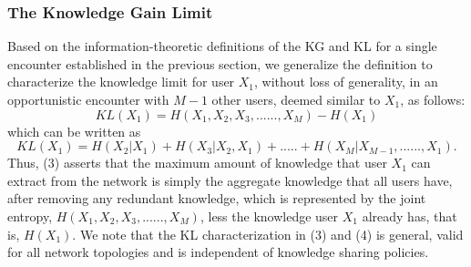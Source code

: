 \documentclass[12pt,epsf]{article}
\theoremstyle{definition}
\begin{document}
\subsubsection{The Knowledge Gain Limit}
\vspace{-0.2 cm}
Based on the information-theoretic definitions of the KG and KL for a single encounter established in the previous section, we generalize the definition to characterize the knowledge limit for user $X_1$, without loss of generality, in an opportunistic encounter with $M-1$ other users, deemed similar to $X_1$, as follows: 
\vspace{-0.6 cm}
\begin{equation}
		KL(X_1) = H(X_1, X_2, X_3, ......, X_M) - H(X_1)
\end{equation}
%
which can be written as
\vspace{-0.4 cm}
\begin{equation}
KL(X_1) = H(X_2|X_1) + H(X_3|X_2,X_1) + .....+ H(X_M|X_{M-1}, ......, X_1).
\end{equation}
Thus, (3) asserts that the maximum amount of knowledge that user $X_1$ can extract from the network is simply the aggregate knowledge that all users have, after removing any redundant knowledge, which is represented by the joint entropy, $H(X_1, X_2, X_3, ......, X_M)$, less the knowledge user $X_1$ already has, that is, $H(X_1)$. We note that the KL characterization in (3) and (4) is general, valid for all network topologies and is independent of knowledge sharing policies.

\vspace{-0.5 cm}
\end{document}
